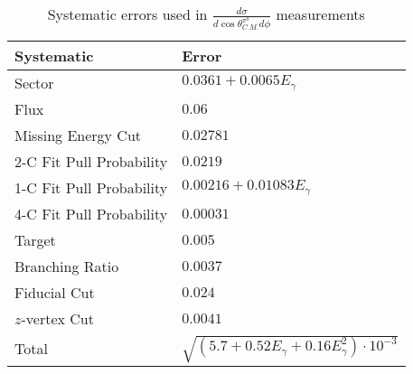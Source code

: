 \begin{table}[h!]
\begin{center}


\caption[Systematics]{\label{tab:systematics}Systematic errors used in $\frac{d\sigma}{d\cos\theta^{\pi^0}_{C.M.} d\phi}$ measurements \vspace{0.75mm}}

\begin{tabular}{p{3.5cm} | p{4.75cm}}
\hline
Systematic & Error \\
\hline
Sector  & $ 0.0361 + 0.0065E_{\gamma}$ \\
Flux  & $ 0.06$ \\
Missing Energy Cut  & $0.02781$ \\
2-C Fit Pull Probability & $0.0219$ \\
1-C Fit Pull Probability  & $ 0.00216 + 0.01083E_{\gamma}$ \\
4-C Fit Pull Probability  & $0.00031$ \\ 
Target  & $0.005$ \\
Branching Ratio  & $0.0037$ \\
Fiducial Cut & $0.024$ \\
$z$-vertex Cut & $0.0041$ \\
Total & $\sqrt{(5.7 +0.52E_{\gamma} +0.16E_{\gamma}^2)\cdot10^{-3}}$ \\
\hline \hline
\end{tabular}


\end{center}
\end{table}
\vspace{20pt}